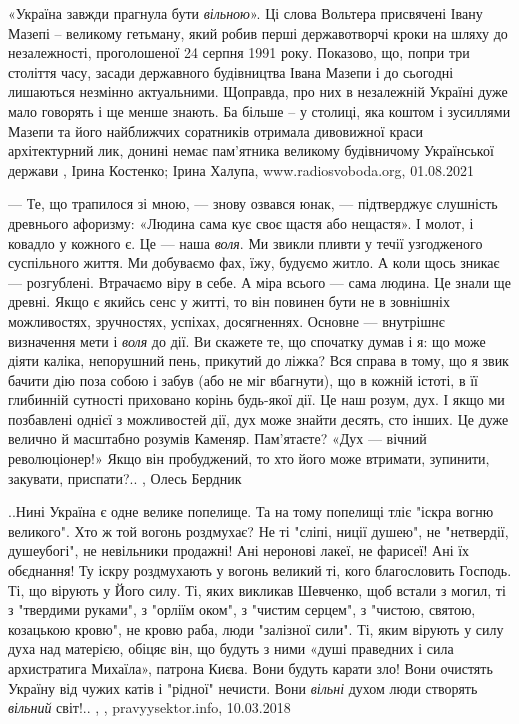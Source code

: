 «Україна завжди прагнула бути \emph{вільною}». Ці слова Вольтера присвячені
Івану Мазепі – великому гетьману, який робив перші державотворчі кроки на шляху
до незалежності, проголошеної 24 серпня 1991 року.  Показово, що, попри три
століття часу, засади державного будівництва Івана Мазепи і до сьогодні
лишаються незмінно актуальними.  Щоправда, про них в незалежній Україні дуже
мало говорять і ще менше знають. Ба більше – у столиці, яка коштом і зусиллями
Мазепи та його найближчих соратників отримала дивовижної краси архітектурний
лик, донині немає пам’ятника великому будівничому Української держави
, 
Ірина Костенко; Ірина Халупа, www.radiosvoboda.org, 01.08.2021

— Те, що трапилося зі мною, — знову озвався юнак, — підтверджує слушність
древнього афоризму: «Людина сама кує своє щастя або нещастя». І молот, і
ковадло у кожного є. Це — наша \emph{воля}. Ми звикли пливти у течії узгодженого
суспільного життя. Ми добуваємо фах, їжу, будуємо житло. А коли щось зникає —
розгублені. Втрачаємо віру в себе. А міра всього — сама людина. Це знали ще
древні. Якщо є якийсь сенс у житті, то він повинен бути не в зовнішніх
можливостях, зручностях, успіхах, досягненнях. Основне — внутрішнє визначення
мети і \emph{воля} до дії. Ви скажете те, що спочатку думав і я: що може діяти каліка,
непорушний пень, прикутий до ліжка? Вся справа в тому, що я звик бачити дію
поза собою і забув (або не міг вбагнути), що в кожній істоті, в її глибинній
сутності приховано корінь будь-якої дії. Це наш розум, дух. І якщо ми
позбавлені однієї з можливостей дії, дух може знайти десять, сто інших. Це дуже
велично й масштабно розумів Каменяр. Пам’ятаєте? «Дух — вічний революціонер!»
Якщо він пробуджений, то хто його може втримати, зупинити, закувати,
приспати?..
, Олесь Бердник

..Нині Україна є одне велике попелище. Та на тому попелищі тліє "іскра вогню
великого". Хто ж той вогонь роздмухає? Не ті "сліпі, ниції душею", не
"нетвердії, душеубогі", не невільники продажні! Ані неронові лакеї, не фарисеї!
Ані їх обєднання! Ту іскру роздмухають у вогонь великий ті, кого благословить
Господь. Ті, що вірують у Його силу. Ті, яких викликав Шевченко, щоб встали з
могил, ті з "твердими руками", з "орліїм оком", з "чистим серцем", з "чистою,
святою, козацькою кровю", не кровю раба, люди "залізної сили". Ті, яким вірують
у силу духа над матерією, обіцяє він, що будуть з ними «душі праведних і сила
архистратига Михаїла», патрона Києва. Вони будуть карати зло! Вони очистять
Україну від чужих катів і "рідної" нечисти. Вони \emph{вільні} духом люди створять
\emph{вільний} світ!..
, , pravyysektor.info, 10.03.2018
